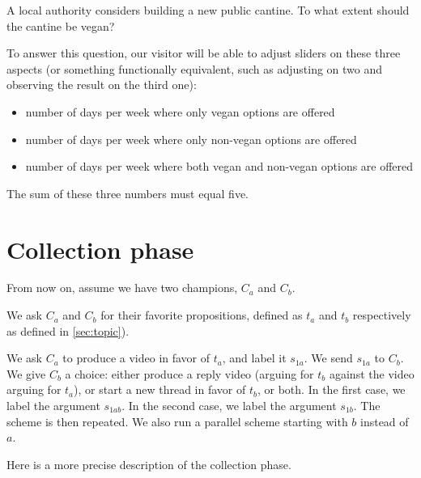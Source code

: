 \documentclass[version=3.21, pagesize, twoside=off, bibliography=totoc, DIV=calc, fontsize=12pt, a4paper]{scrartcl}
\begin{document}
A local authority considers building a new public cantine. To what extent should the cantine be vegan?

To answer this question, our visitor will be able to adjust sliders on these three aspects (or something functionally equivalent, such as adjusting on two and observing the result on the third one):
\begin{itemize}
	\item number of days per week where only vegan options are offered
	\item number of days per week where only non-vegan options are offered
	\item number of days per week where both vegan and non-vegan options are offered
\end{itemize}
The sum of these three numbers must equal five.

\section{Collection phase}
From now on, assume we have two champions, $C_a$ and $C_b$.

We ask $C_a$ and $C_b$ for their favorite propositions, defined as $t_a$ and $t_b$ respectively as defined in \cref{sec:topic}). 

We ask $C_a$ to produce a video in favor of $t_a$, and label it $s_{1a}$. We send $s_{1a}$ to $C_b$. We give $C_b$ a choice: either produce a reply video (arguing for $t_b$ against the video arguing for $t_a$), or start a new thread in favor of $t_b$, or both. In the first case, we label the argument $s_{1ab}$. In the second case, we label the argument $s_{1b}$. The scheme is then repeated. We also run a parallel scheme starting with $b$ instead of $a$.

Here is a more precise description of the collection phase.
\end{document}
